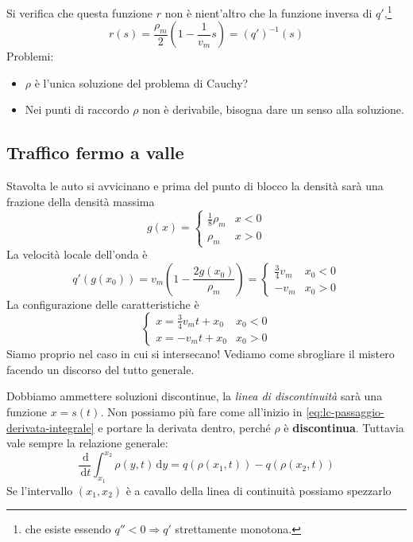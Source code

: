 \documentclass[10pt,a4paper,twoside,openright]{book}
\newcommand{\de}{\,\mathrm d}
\newcommand{\dy}{\de y}
\newcommand{\dt}{\de t}
\begin{document}
Si verifica che questa funzione $r$ non è nient'altro che la funzione inversa di $q'$,\footnote{che esiste essendo $q''< 0\Rightarrow q'$ strettamente monotona.}
\begin{equation*}
    r(s) =\frac{\rho _{m}}{2}\left(1-\frac{1}{v_{m}} s\right) =(q')^{-1}(s)
\end{equation*}
Problemi:
\begin{itemize}
    \item $\rho $ è l'unica soluzione del problema di Cauchy?
    \item Nei punti di raccordo $\rho $ non è derivabile, bisogna dare un senso alla soluzione.
\end{itemize}
\subsection{Traffico fermo a valle}

Stavolta le auto si avvicinano e prima del punto di blocco la densità sarà una frazione della densità massima
\begin{equation*}
    g(x) =
    \begin{cases}
        \frac{1}{8} \rho _{m} & x< 0 \\
        \rho _{m}             & x >0
    \end{cases}
\end{equation*}
La velocità locale dell'onda è
\begin{equation*}
    q'(g(x_{0})) =v_{m}\left(1-\frac{2g(x_{0})}{\rho _{m}}\right) =
    \begin{cases}
        \frac{3}{4} v_{m} & x_{0} < 0 \\
        -v_{m}            & x_{0}  >0
    \end{cases}
\end{equation*}
La configurazione delle caratteristiche è
\begin{equation*}
    \begin{cases}
        x=\frac{3}{4} v_{m} t+x_{0} & x_{0} < 0 \\
        x=-v_{m} t+x_{0}            & x_{0}  >0
    \end{cases}
\end{equation*}
Siamo proprio nel caso in cui si intersecano! Vediamo come sbrogliare il mistero facendo un discorso del tutto generale.


Dobbiamo ammettere soluzioni discontinue, la \textit{linea di discontinuità} sarà una funzione $x=s(t)$. Non possiamo più fare come all'inizio in \eqref{eq:lc-passaggio-derivata-integrale} e portare la derivata dentro, perché $\rho $ è \textbf{discontinua}. Tuttavia vale sempre la relazione generale:
\begin{equation*}
    \frac{\de}{\dt}\int ^{x_{2}}_{x_{1}} \rho (y,t) \dy=q(\rho (x_{1} ,t)) -q(\rho (x_{2} ,t))
\end{equation*}
Se l'intervallo $(x_{1} ,x_{2})$ è a cavallo della linea di continuità possiamo spezzarlo
\end{document}
